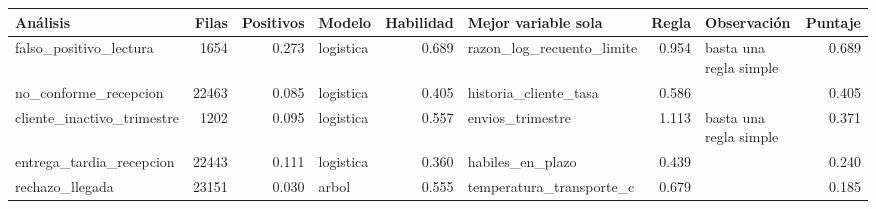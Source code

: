 \begin{tabular}{lrrlrlr>{\raggedright\arraybackslash}p{1.9cm}r}
\toprule
Análisis & Filas & Positivos & Modelo & Habilidad & Mejor variable sola & Regla & Observación & Puntaje \\
\midrule
falso\_positivo\_lectura & 1654 & 0.273 & logistica & 0.689 & razon\_log\_recuento\_limite & 0.954 & basta una regla simple & 0.689 \\
no\_conforme\_recepcion & 22463 & 0.085 & logistica & 0.405 & historia\_cliente\_tasa & 0.586 &  & 0.405 \\
cliente\_inactivo\_trimestre & 1202 & 0.095 & logistica & 0.557 & envios\_trimestre & 1.113 & basta una regla simple & 0.371 \\
entrega\_tardia\_recepcion & 22443 & 0.111 & logistica & 0.360 & habiles\_en\_plazo & 0.439 &  & 0.240 \\
rechazo\_llegada & 23151 & 0.030 & arbol & 0.555 & temperatura\_transporte\_c & 0.679 &  & 0.185 \\
\bottomrule
\end{tabular}
